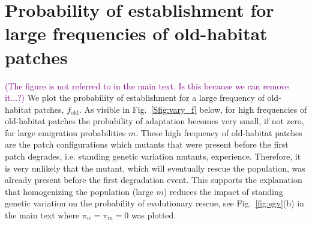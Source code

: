\documentclass[11pt]{article}
\newcommand{\florence}[1]{\textcolor{purple}{(#1)}} %
\newcommand{\chg}[1]{\textcolor{change}{#1}}
\begin{document}
\section{Probability of establishment for large frequencies of old-habitat patches}
\florence{The figure is not referred to in the main text. Is this because we can remove it...?}
\chg{We plot the probability of establishment for a large frequency of old-habitat patches, $f_{\text{old}}$. As visible in Fig.~\ref{Sfig:vary_f} below, for high frequencies of old-habitat patches the probability of adaptation becomes very small, if not zero, for large emigration probabilities $m$. These high frequency of old-habitat patches are the patch configurations which mutants that were present before the first patch degrades, i.e. standing genetic variation mutants, experience. Therefore, it is very unlikely that the mutant, which will eventually rescue the population, was already present before the first degradation event.} This supports the explanation that homogenizing the population (large $m$) reduces the impact of standing genetic variation on the probability of evolutionary rescue, see Fig.~\ref{fig:sgv}(b) in the main text where $\pi_w=\pi_m=0$ was plotted.
\end{document}
